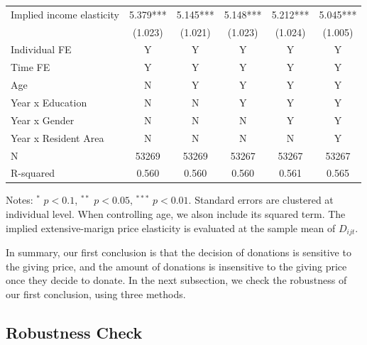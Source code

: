 \documentclass[
  11pt,
  a4paper,
]{article}
\begin{document}
\begin{table}
\begin{threeparttable}
\begin{tabular}[t]{lccccc}
  \hspace{1em}Implied income elasticity & 5.379*** & 5.145*** & 5.148*** & 5.212*** & 5.045***\\
  \hspace{1em} & (1.023) & (1.021) & (1.023) & (1.024) & (1.005)\\
  \hspace{1em}Individual FE & Y & Y & Y & Y & Y\\
  \hspace{1em}Time FE & Y & Y & Y & Y & Y\\
  \hspace{1em}Age & N & Y & Y & Y & Y\\
  \hspace{1em}Year x Education & N & N & Y & Y & Y\\
  \hspace{1em}Year x Gender & N & N & N & Y & Y\\
  \hspace{1em}Year x Resident Area & N & N & N & N & Y\\
  \hspace{1em}N & 53269 & 53269 & 53267 & 53267 & 53267\\
  \hspace{1em}R-squared & 0.560 & 0.560 & 0.560 & 0.561 & 0.565\\
  \bottomrule
  \end{tabular}
  \begin{tablenotes}
  \item Notes: $^{*}$ $p < 0.1$, $^{**}$ $p < 0.05$, $^{***}$ $p < 0.01$. Standard errors are clustered at individual level. When controlling age, we alson include its squared term. The implied extensive-marign price elasticity is evaluated at the sample mean of $D_{ijt}$.
  \end{tablenotes}
  \end{threeparttable}
  \end{table}

  In summary, our first conclusion is that
  the decision of donations is sensitive to the giving price,
  and the amount of donations is insensitive to the giving price once they decide to donate.
  In the next subsection, we check the robustness of our first conclusion, using three methods.

  \hypertarget{robustness-check}{%
  \subsection{Robustness Check}\label{robustness-check}}
\end{document}
